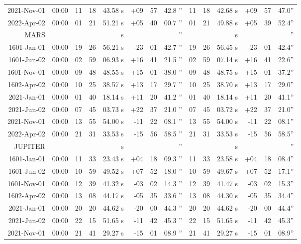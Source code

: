 \begin{longtable}{r@{\,}r|r@{h\,}r@{m\,}r<{s}|r@{°\,}r@{'\,}r<{''}||r@{h\,}r@{m\,}r<{s}|r@{°\,}r@{'\,}r<{''}}
 2021-Nov-01 & 00:00  &   11 & 18 & 43.58 & +09 & 57 & 42.8 & 11&18&42.68 & +09&57&47.0\\ %
 2022-Apr-02 & 00:00  &   01 & 21 & 51.21 & +05 & 40 & 00.7 & 01&21&49.88 & +05&39&52.4\\ %
MARS       \\
 1601-Jan-01 & 00:00  &   19 & 26 & 56.21 & -23 & 01 & 42.7 & 19&26&56.45 & -23&01&42.4\\ %
 1601-Jun-02 & 00:00  &   02 & 59 & 06.93 & +16 & 41 & 21.5 & 02&59&07.14 & +16&41&22.6\\ %
 1601-Nov-01 & 00:00  &   09 & 48 & 48.55 & +15 & 01 & 38.0 & 09&48&48.75 & +15&01&37.2\\ %
 1602-Apr-02 & 00:00  &   10 & 25 & 38.57 & +13 & 17 & 29.7 & 10&25&38.70 & +13&17&29.0\\ %
 2021-Jan-01 & 00:00  &   01 & 40 & 18.14 & +11 & 20 & 41.2 & 01&40&18.14 & +11&20&41.1\\ %
 2021-Jun-02 & 00:00  &   07 & 45 & 03.73 & +22 & 37 & 21.0 & 07&45&03.72 & +22&37&21.0\\ %
 2021-Nov-01 & 00:00  &   13 & 55 & 54.00 & -11 & 22 & 08.1 & 13&55&54.00 & -11&22&08.1\\ %
 2022-Apr-02 & 00:00  &   21 & 31 & 33.53 & -15 & 56 & 58.5 & 21&31&33.53 & -15&56&58.5\\ %
JUPITER          \\
 1601-Jan-01 & 00:00  &   11 & 33 & 23.43 & +04 & 18 & 09.3 & 11&33&23.58 & +04&18&08.4\\ %
 1601-Jun-02 & 00:00  &   10 & 59 & 49.52 & +07 & 52 & 18.0 & 10&59&49.67 & +07&52&17.1\\ %
 1601-Nov-01 & 00:00  &   12 & 39 & 41.32 & -03 & 02 & 14.3 & 12&39&41.47 & -03&02&15.3\\ %
 1602-Apr-02 & 00:00  &   13 & 08 & 44.17 & -05 & 35 & 33.6 & 13&08&44.30 & -05&35&34.4\\ %
 2021-Jan-01 & 00:00  &   20 & 20 & 44.62 & -20 & 00 & 44.3 & 20&20&44.62 & -20&00&44.4\\ %
 2021-Jun-02 & 00:00  &   22 & 15 & 51.65 & -11 & 42 & 45.3 & 22&15&51.65 & -11&42&45.3\\ %
 2021-Nov-01 & 00:00  &   21 & 41 & 29.27 & -15 & 01 & 08.9 & 21&41&29.27 & -15&01&08.9\\ %

\end{longtable}
